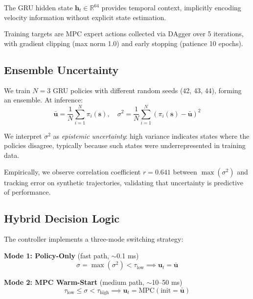 \documentclass[conference]{IEEEtran}
\begin{document}
The GRU hidden state $\mathbf{h}_t \in \mathbb{R}^{64}$ provides temporal context, implicitly encoding velocity information without explicit state estimation.

Training targets are MPC expert actions collected via DAgger over 5 iterations, with gradient clipping (max norm 1.0) and early stopping (patience 10 epochs).

\subsection{Ensemble Uncertainty}

We train $N=3$ GRU policies with different random seeds (42, 43, 44), forming an ensemble. At inference:
\begin{equation}
\bar{\mathbf{u}} = \frac{1}{N}\sum_{i=1}^N \pi_i(\mathbf{s}), \quad \sigma^2 = \frac{1}{N}\sum_{i=1}^N (\pi_i(\mathbf{s}) - \bar{\mathbf{u}})^2
\end{equation}

We interpret $\sigma^2$ as \emph{epistemic uncertainty}: high variance indicates states where the policies disagree, typically because such states were underrepresented in training data.

Empirically, we observe correlation coefficient $r = 0.641$ between $\max(\sigma^2)$ and tracking error on synthetic trajectories, validating that uncertainty is predictive of performance.

\subsection{Hybrid Decision Logic}

The controller implements a three-mode switching strategy:

\textbf{Mode 1: Policy-Only} (fast path, $\sim$0.1 ms)
\begin{equation}
\sigma = \max(\sigma^2) < \tau_{\text{low}} \implies \mathbf{u}_t = \bar{\mathbf{u}}
\end{equation}

\textbf{Mode 2: MPC Warm-Start} (medium path, $\sim$10--50 ms)
\begin{equation}
\tau_{\text{low}} \leq \sigma < \tau_{\text{high}} \implies \mathbf{u}_t = \text{MPC}(\text{init}=\bar{\mathbf{u}})
\end{equation}
\end{document}
